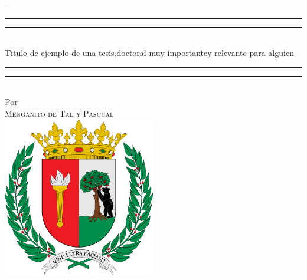 %
% 
%
%
\setlrmarginsandblock{3.5cm}{2.5cm}{*}
\checkandfixthelayout 
\begin{titlingpage}
\begin{SingleSpace}
\calccentering{\unitlength} 
\begin{adjustwidth*}{\unitlength}{-\unitlength}
\begin{center}
\rule[0.5ex]{\linewidth}{2pt}\vspace*{-\baselineskip}\vspace*{3.2pt}
\rule[0.5ex]{\linewidth}{1pt}\\[\baselineskip]
{\HUGE Titulo de ejemplo de una tesis,\newline doctoral muy importante\newline y relevante para alguien}\\[4mm]
\rule[0.5ex]{\linewidth}{1pt}\vspace*{-\baselineskip}\vspace{3.2pt}
\rule[0.5ex]{\linewidth}{2pt}\\
\vspace{5mm}
{\large Por}\\
\vspace{5mm}
{\large\textsc{Menganito de Tal y Pascual}}\\
\vspace{5mm}
\includegraphics[height=7cm]{./logos/uam.png}\\

\end{center}
\end{adjustwidth*}
\end{SingleSpace}
\end{titlingpage}
